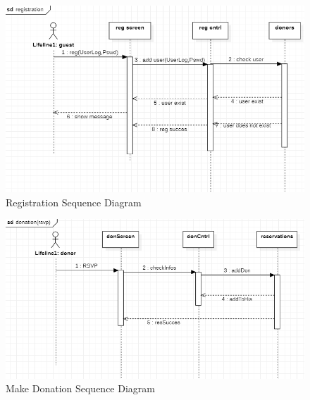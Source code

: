 \begin{figure}[H]
    \centering
    \includegraphics[width=1\textwidth]{images/regs.png}
    \caption{Registration Sequence Diagram}
    \label{fig:figure4}
\end{figure}

\begin{figure}[H]
    \centering
    \includegraphics[width=1\textwidth]{images/don.png}
    \caption{Make Donation Sequence Diagram}
    \label{fig:figure4}
\end{figure}





